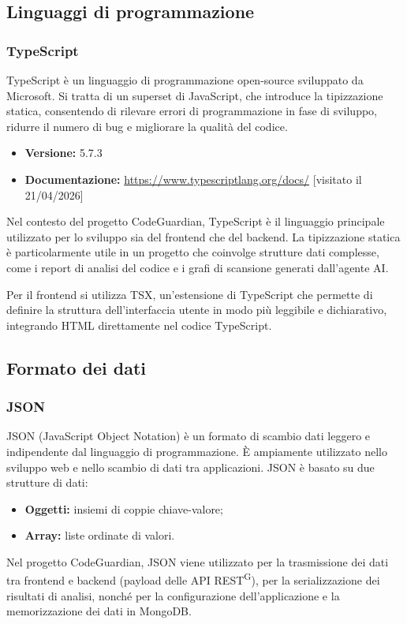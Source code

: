 \documentclass[a4paper, 11pt]{article}
\begin{document}
\subsection{Linguaggi di programmazione}

\subsubsection{TypeScript}
TypeScript è un linguaggio di programmazione open-source sviluppato da Microsoft. Si tratta di un superset di JavaScript, che introduce la tipizzazione statica, consentendo di rilevare errori di programmazione in fase di sviluppo, ridurre il numero di bug e migliorare la qualità del codice.
\begin{itemize}
  \item \textbf{Versione:} 5.7.3
  \item \textbf{Documentazione:} \url{https://www.typescriptlang.org/docs/} [visitato il 21/04/2026]
\end{itemize}
Nel contesto del progetto CodeGuardian, TypeScript è il linguaggio principale utilizzato per lo sviluppo sia del frontend che del backend. La tipizzazione statica è particolarmente utile in un progetto che coinvolge strutture dati complesse, come i report di analisi del codice e i grafi di scansione generati dall'agente AI\@.

Per il frontend si utilizza TSX, un'estensione di TypeScript che permette di definire la struttura dell'interfaccia utente in modo più leggibile e dichiarativo, integrando HTML direttamente nel codice TypeScript.

\subsection{Formato dei dati}

\subsubsection{JSON}
JSON (JavaScript Object Notation) è un formato di scambio dati leggero e indipendente dal linguaggio di programmazione. È ampiamente utilizzato nello sviluppo web e nello scambio di dati tra applicazioni. JSON è basato su due strutture di dati:
\begin{itemize}
  \item \textbf{Oggetti:} insiemi di coppie chiave-valore;
  \item \textbf{Array:} liste ordinate di valori.
\end{itemize}
Nel progetto CodeGuardian, JSON viene utilizzato per la trasmissione dei dati tra frontend e backend (payload delle API REST\textsuperscript{G}), per la serializzazione dei risultati di analisi, nonché per la configurazione dell'applicazione e la memorizzazione dei dati in MongoDB\@.
\end{document}
